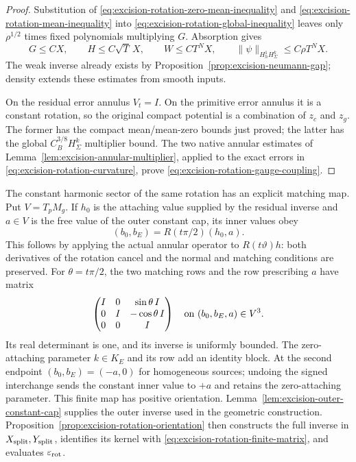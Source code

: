 \documentclass[11pt]{amsart}
\theoremstyle{definition}
\theoremstyle{remark}
\theoremstyle{plain}
\begin{document}
\begin{proof}
Substitution of
\eqref{eq:excision-rotation-zero-mean-inequality} and
\eqref{eq:excision-rotation-mean-inequality} into
\eqref{eq:excision-rotation-global-inequality}
leaves only $\rho^{1/2}$ times fixed polynomials
multiplying $G$. Absorption gives
\[
 G\leq CX,\qquad H\leq C\sqrt T\,X,\qquad
 W\leq CT^NX,\qquad
 \|\psi\|_{H^1_hH^k_\Sigma}\leq C\rho T^NX .
\]
The weak inverse already exists by
Proposition~\ref{prop:excision-neumann-gap}; density
extends these estimates from smooth inputs.

On the residual error annulus $V_t=I$.
On the primitive error annulus it is a constant rotation,
so the original compact potential is a combination
of $z_c$ and $z_g$. The former has the compact
mean/mean-zero bounds just proved; the latter has
the global $C^{3/8}_BH^k_\Sigma$ multiplier bound.
The two native annular estimates of
Lemma~\ref{lem:excision-annular-multiplier}, applied
to the exact errors in
\eqref{eq:excision-rotation-curvature}, prove
\eqref{eq:excision-rotation-gauge-coupling}.
\end{proof}

The constant harmonic sector of the same rotation has
an explicit matching map. Put $V=T_pM_g$.
If $h_0$ is the attaching value supplied by the residual
inverse and $a\in V$ is the free value of the outer
constant cap, its inner values obey
\[
                 (b_0,b_E)=R(t\pi/2)(h_0,a).
\]
This follows by applying the actual annular operator
to $R(t\vartheta)h$: both derivatives of the rotation
cancel and the normal and matching conditions are
preserved. For $\theta=t\pi/2$, the two matching
rows and the row prescribing $a$ have matrix
\begin{equation}\label{eq:excision-rotation-finite-matrix}
 \begin{pmatrix}
 I&0&\sin\theta\,I\\
 0&I&-\cos\theta\,I\\
 0&0&I
 \end{pmatrix}
 \quad\hbox{on }(b_0,b_E,a)\in V^3 .
\end{equation}
Its real determinant is one, and its inverse is
uniformly bounded. The zero-attaching parameter
$k\in K_E$ and its row add an identity block.
At the second endpoint $(b_0,b_E)=(-a,0)$ for
homogeneous sources; undoing the signed interchange
sends the constant inner value to $+a$ and retains
the zero-attaching parameter. This finite map has positive orientation.
Lemma~\ref{lem:excision-outer-constant-cap} supplies the
outer inverse used in the geometric construction.
Proposition~\ref{prop:excision-rotation-orientation}
then constructs the full inverse in
$X_{\rm split},Y_{\rm split}$, identifies its kernel
with \eqref{eq:excision-rotation-finite-matrix},
and evaluates $\varepsilon_{\rm rot}$.
\end{document}
